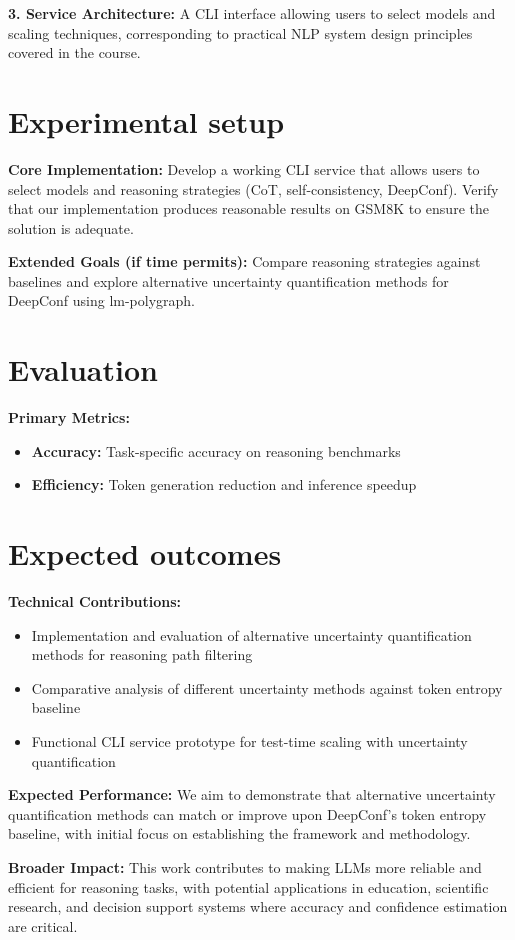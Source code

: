 \documentclass[11pt]{article}
\begin{document}
\textbf{3. Service Architecture:} A CLI interface allowing users to select models and scaling techniques, corresponding to practical NLP system design principles covered in the course.


\section{Experimental setup}

\textbf{Core Implementation:} Develop a working CLI service that allows users to select models and reasoning strategies (CoT, self-consistency, DeepConf). Verify that our implementation produces reasonable results on GSM8K to ensure the solution is adequate.

\textbf{Extended Goals (if time permits):} Compare reasoning strategies against baselines and explore alternative uncertainty quantification methods for DeepConf using lm-polygraph.


\section{Evaluation}

\textbf{Primary Metrics:}
\begin{itemize}
\item \textbf{Accuracy:} Task-specific accuracy on reasoning benchmarks
\item \textbf{Efficiency:} Token generation reduction and inference speedup
\end{itemize}


\section{Expected outcomes}

\textbf{Technical Contributions:}
\begin{itemize}
\item Implementation and evaluation of alternative uncertainty quantification methods for reasoning path filtering
\item Comparative analysis of different uncertainty methods against token entropy baseline
\item Functional CLI service prototype for test-time scaling with uncertainty quantification
\end{itemize}

\textbf{Expected Performance:} We aim to demonstrate that alternative uncertainty quantification methods can match or improve upon DeepConf's token entropy baseline, with initial focus on establishing the framework and methodology.

\textbf{Broader Impact:} This work contributes to making LLMs more reliable and efficient for reasoning tasks, with potential applications in education, scientific research, and decision support systems where accuracy and confidence estimation are critical.


\end{document}
